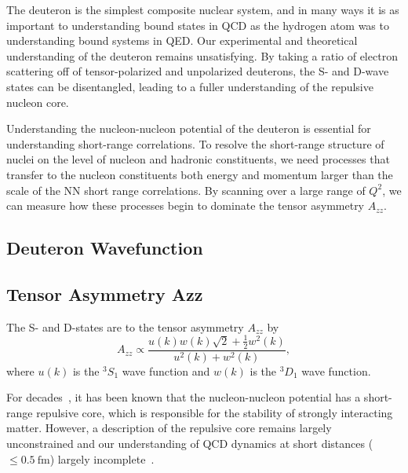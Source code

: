 

The deuteron is the simplest composite nuclear system, and in many ways it is as important to understanding bound states in QCD as the hydrogen atom was to understanding bound systems in QED.  Our experimental and theoretical understanding of the deuteron remains unsatisfying. By taking a ratio of electron scattering off of tensor-polarized and unpolarized deuterons, the S- and D-wave states can be disentangled, leading to a fuller understanding of the repulsive nucleon core. 

Understanding the nucleon-nucleon potential of the deuteron is essential for understanding short-range correlations. To resolve the short-range structure of nuclei on the level of nucleon and hadronic constituents, we need processes that transfer to the nucleon constituents both energy and momentum larger than the scale of the NN short range correlations. By scanning over a large range of $Q^2$, we can measure how these processes begin to dominate the tensor asymmetry $A_{zz}$.




\subsection{Deuteron Wavefunction}


\subsection{Tensor Asymmetry Azz}


The S- and D-states are to the tensor asymmetry $A_{zz}$ by~\cite{Frankfurt:1988nt}
\begin{equation}
	A_{zz} \propto \frac{u(k)w(k)\sqrt{2}+\frac{1}{2}w^2(k)}{u^2(k)+w^2(k)},
\end{equation}
where $u(k)$ is the $^3S_1$ wave function and $w(k)$ is the $^3D_1$ wave function.


For decades~\cite{PhysRev.81.165}, it has been known that the nucleon-nucleon potential has a short-range repulsive core, which is responsible for the stability of strongly interacting matter. However, a description of the repulsive core remains largely unconstrained and our understanding of QCD dynamics at short distances ($\leq 0.5\mathrm{~fm}$) largely incomplete~\cite{Sargsian:2014bwa}. 

